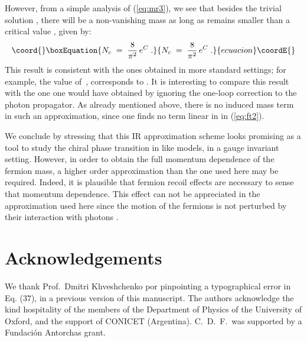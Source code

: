 \documentclass[12pt,a4paper]{article} \usepackage[latin1] {inputenc}
\begin{document}
However, from a simple analysis of (\ref{eq:mr3}), we see that besides
the trivial solution \coordHE{}, there will be a non-vanishing mass as long
as \coordHE{} remains smaller than a critical value \coordHE{}, given by:
\begin{equation}\coord{}\boxEquation{\label{eq:mr4}
N_c \;=\; \frac{8}{\pi^2} \, e^C \;.
}{N_c \;=\; \frac{8}{\pi^2} \, e^C \;.
}{ecuacion}\coordE{}\end{equation}
This result is consistent with the ones obtained in more standard
settings; for example, the value \coordHE{}
of~\cite{Appelquist:1988sr}, corresponds to \coordHE{}.  It
is interesting to compare this result with the one one would have
obtained by ignoring the one-loop correction to the photon propagator.
As already mentioned above, there is no induced mass term in such an
approximation, since one finds no term linear in \coordHE{} in
(\ref{eq:ft2}).

We conclude by stressing that this IR approximation scheme looks
promising as a tool to study the chiral phase transition in \coordHE{}
like models, in a gauge invariant setting.  However, in order to
obtain the full momentum dependence of the fermion mass, a higher
order approximation than the one used here may be required. Indeed, it
is plausible that fermion recoil effects are necessary to sense that
momentum dependence. This effect can not be appreciated in the
approximation used here since the motion of the fermions is not
perturbed by their interaction with photons \cite{Karanikas:1995zi}.

\section*{Acknowledgements}
We thank Prof.\ Dmitri Khveshchenko por pinpointing a typographical 
error in Eq. (37), in a previous version of this manuscript.
The authors acknowledge the kind hospitality of the members of the
Department of Physics of the University of Oxford, and the support of
CONICET (Argentina).  C.\ D.\ F.\ was supported by a Fundaci\'on
Antorchas grant.

\end{document}
